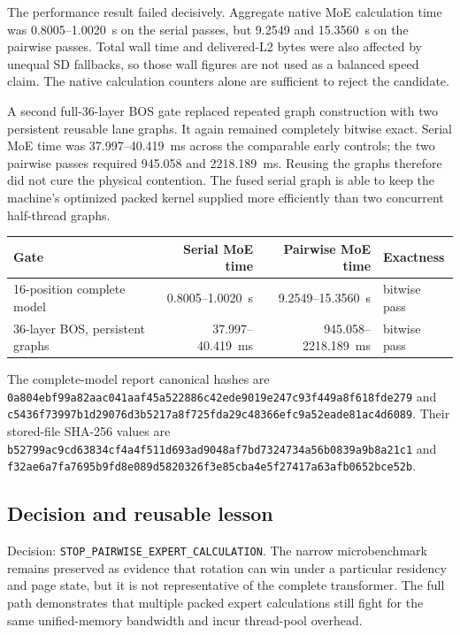 The performance result failed decisively.  Aggregate native MoE calculation
time was 0.8005--1.0020~s on the serial passes, but 9.2549 and 15.3560~s on the
pairwise passes.  Total wall time and delivered-L2 bytes were also affected by
unequal SD fallbacks, so those wall figures are not used as a balanced speed
claim.  The native calculation counters alone are sufficient to reject the
candidate.

A second full-36-layer BOS gate replaced repeated graph construction with two
persistent reusable lane graphs.  It again remained completely bitwise exact.
Serial MoE time was 37.997--40.419~ms across the comparable early controls;
the two pairwise passes required 945.058 and 2218.189~ms.  Reusing the graphs
therefore did not cure the physical contention.  The fused serial graph is able
to keep the machine's optimized packed kernel supplied more efficiently than
two concurrent half-thread graphs.

\begin{center}
\begin{tabular}{lrrl}
\toprule
Gate & Serial MoE time & Pairwise MoE time & Exactness \\
\midrule
16-position complete model & 0.8005--1.0020~s & 9.2549--15.3560~s & bitwise pass \\
36-layer BOS, persistent graphs & 37.997--40.419~ms & 945.058--2218.189~ms & bitwise pass \\
\bottomrule
\end{tabular}
\end{center}

The complete-model report canonical hashes are
\texttt{0a804ebf99a82aac041aaf45a522886c42ede9019e247c93f449a8f618fde279}
and
\texttt{c5436f73997b1d29076d3b5217a8f725fda29c48366efc9a52eade81ac4d6089}.
Their stored-file SHA-256 values are
\texttt{b52799ac9cd63834cf4a4f511d693ad9048af7bd7324734a56b0839a9b8a21c1}
and
\texttt{f32ae6a7fa7695b9fd8e089d5820326f3e85cba4e5f27417a63afb0652bce52b}.

\subsection{Decision and reusable lesson}

Decision: \texttt{STOP\_PAIRWISE\_EXPERT\_CALCULATION}.  The narrow
microbenchmark remains preserved as evidence that rotation can win under a
particular residency and page state, but it is not representative of the
complete transformer.  The full path demonstrates that multiple packed expert
calculations still fight for the same unified-memory bandwidth and incur
thread-pool overhead.

